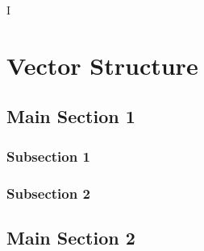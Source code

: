 I%

\chapter{Vector Structure} %

\label{VectorStructure} %



\section{Main Section 1}


\subsection{Subsection 1}



\subsection{Subsection 2}



\section{Main Section 2}
